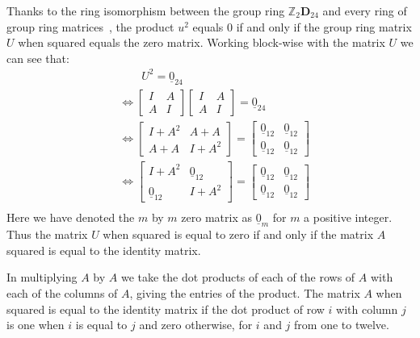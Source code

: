 Thanks to the ring isomorphism between the group ring $\mathbb{Z}_2 \mathbf{D}_{24}$ and every ring of group ring matrices~\cite{hur07,hur09}, the product $u^2$ equals $0$ if and only if the group ring matrix $U$ when squared equals the zero matrix.
Working block-wise with the matrix $U$ we can see that:
\begin{equation*}
\begin{split}
&\qquad U^2 = \underline{0}_{24} \\
&\Leftrightarrow \left[ \begin{array}{cc} I & A \\ A & I \end{array} \right] \left[ \begin{array}{cc} I & A \\ A & I \end{array} \right] = \underline{0}_{24} \\
&\Leftrightarrow \left[ \begin{array}{cc} I + A^2 & A + A \\ A + A & I + A^2 \end{array} \right]  = \left[ \begin{array}{cc} \underline{0}_{12} & \underline{0}_{12} \\ \underline{0}_{12} & \underline{0}_{12} \end{array} \right] \\
&\Leftrightarrow \left[ \begin{array}{cc} I + A^2 & \underline{0}_{12} \\ \underline{0}_{12} & I + A^2 \end{array} \right]  = \left[ \begin{array}{cc} \underline{0}_{12} & \underline{0}_{12} \\ \underline{0}_{12} & \underline{0}_{12} \end{array} \right] \\
\end{split}
\end{equation*}
Here we have denoted the $m$ by $m$ zero matrix as $\underline{0}_{m}$ for $m$ a positive integer.
Thus the matrix $U$ when squared is equal to zero if and only if the matrix $A$ squared is equal to the identity matrix.

In multiplying $A$ by $A$ we take the dot products of each of the rows of $A$ with each of the columns of $A$, giving the entries of the product.
The matrix $A$ when squared is equal to the identity matrix if the dot product of row $i$ with column $j$ is one when $i$ is equal to $j$ and zero otherwise, for $i$ and $j$ from one to twelve.

